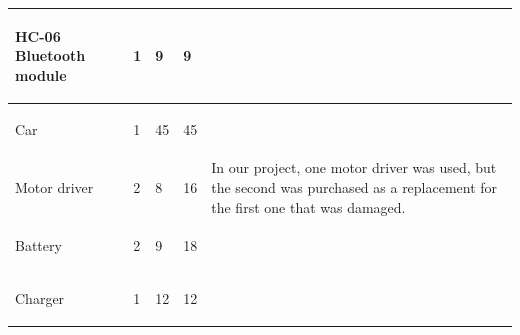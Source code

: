 \documentclass[12pt,a4paper]{report}
\begin{document}
\begin{table}[H]
\begin{center}
\begin{tabular}{|p{6cm}  |p{1cm}  |p{2cm}  |p{1.7cm} |p{3.5cm}|}
\begin{center} HC-06 Bluetooth module   \end{center}  &\begin{center}1 \end{center} & \begin{center} 9 \end{center}	& \begin{center} 9	\end{center}     &	 \\\hline


\begin{center} Car   \end{center}  &\begin{center}1 \end{center} & \begin{center} 45 \end{center}	& \begin{center} 45	\end{center}     &	 \\\hline


\begin{center} Motor driver    \end{center}  &\begin{center}2 \end{center} & \begin{center} 8\end{center}	& \begin{center} 16	\end{center} &In our project, one motor driver was used, but the second was purchased as a replacement for the first one that was damaged.
\\\hline


\begin{center} Battery    \end{center}  &\begin{center}2 \end{center} & \begin{center} 9 \end{center}	& \begin{center} 18	\end{center}     &	 \\\hline


\begin{center} Charger	    \end{center}  &\begin{center}1 \end{center} & \begin{center} 12 \end{center}	& \begin{center} 12	\end{center}     &	 \\\hline



\end{tabular}
\end{center}
\end{table}
\end{document}
